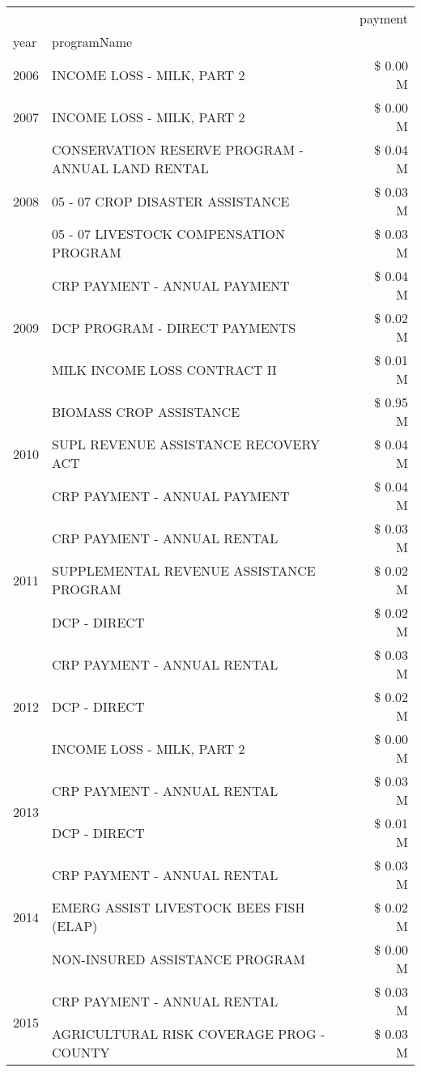 \begin{tabular}{llr}
\toprule
 &  & payment \\
year & programName &  \\
\midrule
2006 & INCOME LOSS - MILK, PART 2 & \$ 0.00 M \\
\cline{1-3}
2007 & INCOME LOSS - MILK, PART 2 & \$ 0.00 M \\
\cline{1-3}
\multirow[t]{3}{*}{2008} & CONSERVATION RESERVE PROGRAM - ANNUAL LAND RENTAL & \$ 0.04 M \\
 & 05 - 07 CROP DISASTER ASSISTANCE & \$ 0.03 M \\
 & 05 - 07 LIVESTOCK COMPENSATION PROGRAM & \$ 0.03 M \\
\cline{1-3}
\multirow[t]{3}{*}{2009} & CRP PAYMENT - ANNUAL PAYMENT & \$ 0.04 M \\
 & DCP PROGRAM - DIRECT PAYMENTS & \$ 0.02 M \\
 & MILK INCOME LOSS CONTRACT II & \$ 0.01 M \\
\cline{1-3}
\multirow[t]{3}{*}{2010} & BIOMASS CROP ASSISTANCE & \$ 0.95 M \\
 & SUPL REVENUE ASSISTANCE RECOVERY ACT & \$ 0.04 M \\
 & CRP PAYMENT - ANNUAL PAYMENT & \$ 0.04 M \\
\cline{1-3}
\multirow[t]{3}{*}{2011} & CRP PAYMENT - ANNUAL RENTAL & \$ 0.03 M \\
 & SUPPLEMENTAL REVENUE ASSISTANCE PROGRAM & \$ 0.02 M \\
 & DCP - DIRECT & \$ 0.02 M \\
\cline{1-3}
\multirow[t]{3}{*}{2012} & CRP PAYMENT - ANNUAL RENTAL & \$ 0.03 M \\
 & DCP - DIRECT & \$ 0.02 M \\
 & INCOME LOSS - MILK, PART 2 & \$ 0.00 M \\
\cline{1-3}
\multirow[t]{2}{*}{2013} & CRP PAYMENT - ANNUAL RENTAL & \$ 0.03 M \\
 & DCP - DIRECT & \$ 0.01 M \\
\cline{1-3}
\multirow[t]{3}{*}{2014} & CRP PAYMENT - ANNUAL RENTAL & \$ 0.03 M \\
 & EMERG ASSIST LIVESTOCK BEES FISH (ELAP) & \$ 0.02 M \\
 & NON-INSURED ASSISTANCE PROGRAM & \$ 0.00 M \\
\cline{1-3}
\multirow[t]{3}{*}{2015} & CRP PAYMENT - ANNUAL RENTAL & \$ 0.03 M \\
 & AGRICULTURAL RISK COVERAGE PROG - COUNTY & \$ 0.03 M \\

\end{tabular}
